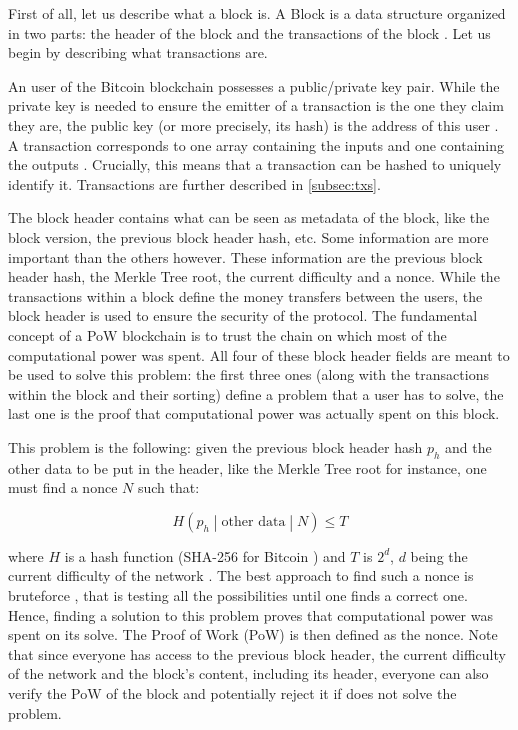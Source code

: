 \documentclass[11pt]{report}
\begin{document}
                First of all, let us describe what a block is. A Block is a data structure organized in two parts: the header of the block and the transactions of the block \cite{BitcoinHeader}. Let us begin by describing what transactions are.
                
                An user of the Bitcoin blockchain possesses a public/private key pair. While the private key is needed to ensure the emitter of a transaction is the one they claim they are, the public key (or more precisely, its hash) is the address of this user \cite{BitcoinTX}. A transaction corresponds to one array containing the inputs and one containing the outputs \cite{SoK}. Crucially, this means that a transaction can be hashed to uniquely identify it. Transactions are further described in \autoref{subsec:txs}.
                
                The block header contains what can be seen as metadata of the block, like the block version, the previous block header hash, etc. Some information are more important than the others however. These information are the previous block header hash, the Merkle Tree root, the current difficulty and a nonce. While the transactions within a block define the money transfers between the users, the block header is used to ensure the security of the protocol. The fundamental concept of a PoW blockchain is to trust the chain on which most of the computational power was spent. All four of these block header fields are meant to be used to solve this problem: the first three ones (along with the transactions within the block and their sorting) define a problem that a user has to solve, the last one is the proof that computational power was actually spent on this block.
                
                This problem is the following: given the previous block header hash \(p_h\) and the other data to be put in the header, like the Merkle Tree root for instance, one must find a nonce \(N\) such that:
                
                \[H\left(p_h\middle|\text{other data}\middle|N\right)\leqslant T\]
                
                where \(H\) is a hash function (SHA-256 for Bitcoin \cite{SoK}) and \(T\) is \(2^{d}\), \(d\) being the current difficulty of the network \cite{PoDL}. The best approach to find such a nonce is bruteforce \cite{PoDL}, that is testing all the possibilities until one finds a correct one. Hence, finding a solution to this problem proves that computational power was spent on its solve. The Proof of Work (PoW) is then defined as the nonce. Note that since everyone has access to the previous block header, the current difficulty of the network and the block's content, including its header, everyone can also verify the PoW of the block and potentially reject it if does not solve the problem.
                
\end{document}
